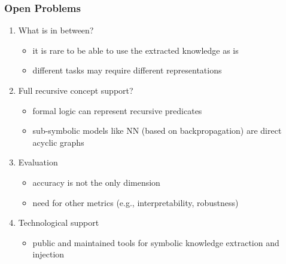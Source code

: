 \documentclass[presentation]{beamer}\mode<presentation>{\usetheme{blackAMSBolognaFC}}
\begin{document}
\begin{frame}%
\frametitle{Open Problems}

    \begin{enumerate}
        \item What is in between?
        \begin{itemize}
            \item it is rare to be able to use the extracted knowledge as is
            \item different tasks may require different representations
        \end{itemize}

        \vfill

        \item Full recursive concept support?
        \begin{itemize}
            \item formal logic can represent recursive predicates
            \item sub-symbolic models like NN (based on \alert{backpropagation}) are direct acyclic graphs
        \end{itemize}

        \vfill

        \item Evaluation
        \begin{itemize}
            \item accuracy is not the only dimension
            \item need for other metrics (e.g., interpretability, robustness)~
        \end{itemize}

        \vfill

        \item Technological support
        \begin{itemize}
            \item \alert{public} and \alert{maintained} tools for symbolic knowledge extraction and injection~
        \end{itemize}

    \end{enumerate}

\end{frame}
\end{document}
